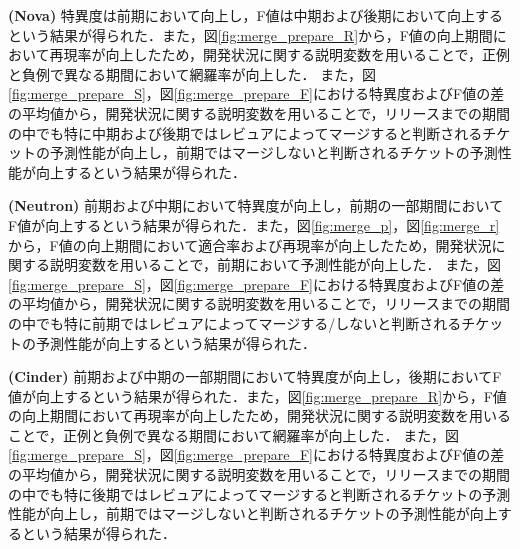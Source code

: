 \documentclass[11pt]{jreport}
\begin{document}
\textbf{ (Nova) }特異度は前期において向上し，F値は中期および後期において向上するという結果が得られた．また，図\ref{fig:merge_prepare_R}から，F値の向上期間において再現率が向上したため，開発状況に関する説明変数を用いることで，正例と負例で異なる期間において網羅率が向上した．
また，図\ref{fig:merge_prepare_S}，図\ref{fig:merge_prepare_F}における特異度およびF値の差の平均値から，開発状況に関する説明変数を用いることで，リリースまでの期間の中でも特に中期および後期ではレビュアによってマージすると判断されるチケットの予測性能が向上し，前期ではマージしないと判断されるチケットの予測性能が向上するという結果が得られた．

\textbf{ (Neutron) }前期および中期において特異度が向上し，前期の一部期間においてF値が向上するという結果が得られた．また，図\ref{fig:merge_p}，図\ref{fig:merge_r}から，F値の向上期間において適合率および再現率が向上したため，開発状況に関する説明変数を用いることで，前期において予測性能が向上した．
また，図\ref{fig:merge_prepare_S}，図\ref{fig:merge_prepare_F}における特異度およびF値の差の平均値から，開発状況に関する説明変数を用いることで，リリースまでの期間の中でも特に前期ではレビュアによってマージする/しないと判断されるチケットの予測性能が向上するという結果が得られた．

\textbf{ (Cinder) }前期および中期の一部期間において特異度が向上し，後期においてF値が向上するという結果が得られた．また，図\ref{fig:merge_prepare_R}から，F値の向上期間において再現率が向上したため，開発状況に関する説明変数を用いることで，正例と負例で異なる期間において網羅率が向上した．
また，図\ref{fig:merge_prepare_S}，図\ref{fig:merge_prepare_F}における特異度およびF値の差の平均値から，開発状況に関する説明変数を用いることで，リリースまでの期間の中でも特に後期ではレビュアによってマージすると判断されるチケットの予測性能が向上し，前期ではマージしないと判断されるチケットの予測性能が向上するという結果が得られた．
\end{document}

